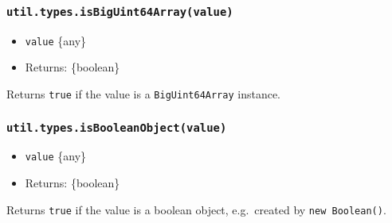 \subsubsection{\texorpdfstring{\texttt{util.types.isBigUint64Array(value)}}{util.types.isBigUint64Array(value)}}\label{util.types.isbiguint64arrayvalue}

\begin{itemize}
\tightlist
\item
  \texttt{value} \{any\}
\item
  Returns: \{boolean\}
\end{itemize}

Returns \texttt{true} if the value is a \texttt{BigUint64Array}
instance.

\begin{Shaded}
\begin{Highlighting}[]
\NormalTok{(} \NormalTok{())}\OperatorTok{;}   
\NormalTok{(} \NormalTok{())}\OperatorTok{;}  
\end{Highlighting}
\end{Shaded}

\subsubsection{\texorpdfstring{\texttt{util.types.isBooleanObject(value)}}{util.types.isBooleanObject(value)}}\label{util.types.isbooleanobjectvalue}

\begin{itemize}
\tightlist
\item
  \texttt{value} \{any\}
\item
  Returns: \{boolean\}
\end{itemize}

Returns \texttt{true} if the value is a boolean object, e.g.~created by
\texttt{new\ Boolean()}.

